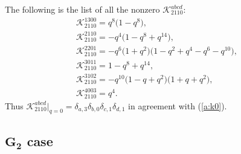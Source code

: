 \documentclass[11pt]{article}
\begin{document}
\begin{example}\label{ex:K}
The following is the list of all the nonzero $\mathscr{K}^{abcd}_{2110}$:
\begin{gather*}
\mathscr{K}^{1300}_{2110}=q^8 \big(1 - q^8\big),\\
\mathscr{K}^{2110}_{2110} =-q^4 \big(1 - q^8 + q^{14}\big),\\
\mathscr{K}^{2201}_{2110} =-q^6 \big(1 + q^2\big) \big(1 - q^2 + q^4 - q^6 - q^{10}\big),\\
\mathscr{K}^{3011}_{2110} =1 - q^8 + q^{14},\\
\mathscr{K}^{3102}_{2110} =-q^{10} \big(1 - q + q^2\big) \big(1 + q + q^2\big),\\
\mathscr{K}^{4003}_{2110}=q^4.
\end{gather*}
Thus $\mathscr{K}^{abcd}_{2110}|_{q=0}
= \delta_{a,3}\delta_{b,0}\delta_{c,1}\delta_{d,1}$ in agreement with
(\ref{a:k0}).
\end{example}

\subsection[$G_2$ case]{$\boldsymbol{G_2}$ case}\label{a:ss:g2}
\end{document}
